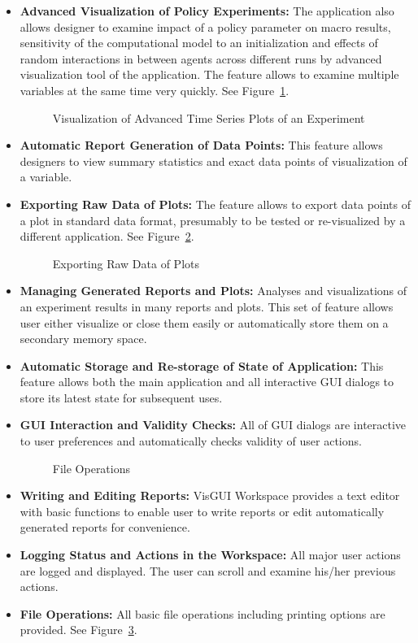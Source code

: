 \begin{itemize}
\item \textbf{Advanced Visualization of Policy Experiments:} The application also allows designer to examine impact of a policy parameter on macro results, sensitivity of the computational model to an initialization and effects of random interactions in between agents across different runs by advanced visualization tool of the application. The feature allows to examine multiple variables at the same time very quickly. See Figure~\ref{figure:advancedTS}.
\begin{figure}[h]
  \centering
{}
  \caption{Visualization of Advanced Time Series Plots of an Experiment}
  \label{figure:advancedTS}
\end{figure}
\item \textbf{Automatic Report Generation of Data Points:} This feature allows designers to view summary statistics and exact data points of visualization of a variable.
\item \textbf{Exporting Raw Data of Plots:} The feature allows to export data points of a plot in standard data format, presumably to be tested or re-visualized by a different application. See Figure~\ref{figure:export}.
\begin{figure}[h]
  \centering
{}
  \caption{Exporting Raw Data of Plots}
  \label{figure:export}
\end{figure} 
\item \textbf{Managing Generated Reports and Plots:} Analyses and visualizations of an experiment results in many reports and plots. This set of feature allows user either visualize or close them easily or automatically store them on a secondary memory space.
\item \textbf{Automatic Storage and Re-storage of State of Application:} This feature allows both the main application and all interactive GUI dialogs to store its latest state for subsequent uses.
\item \textbf{GUI Interaction and Validity Checks:} All of GUI dialogs are interactive to user preferences and automatically checks validity of user actions.
\begin{figure}[h]
  \centering
{}
  \caption{File Operations}
  \label{figure:fileop}
\end{figure}
\item \textbf{Writing and Editing Reports:} VisGUI Workspace provides a text editor with basic functions to enable user to write reports or edit automatically generated reports for convenience.
\item \textbf{Logging Status and Actions in the Workspace:} All major user actions are logged and displayed. The user can scroll and examine his/her previous actions.
\item \textbf{File Operations:} All basic file operations including printing options are provided. See Figure~\ref{figure:fileop}.


\end{itemize}
